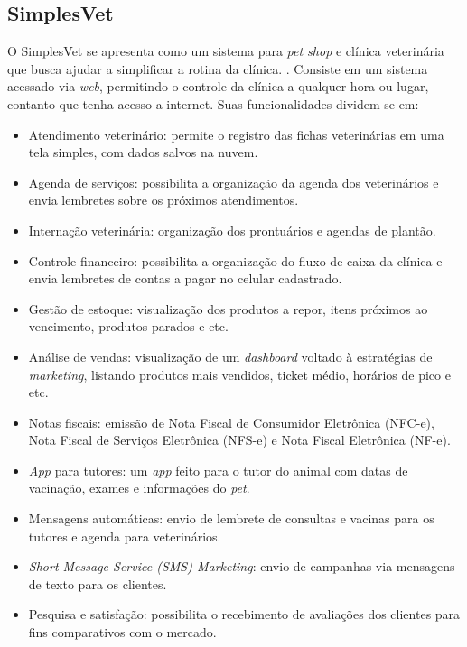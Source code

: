 \documentclass[
    12pt,               %
    openright,          %
    oneside,
    a4paper,            %
    BIBLATEX,           %
    TODO,               %
    english,            %
    brazil              %
    ]{ifsp-spo-inf-ctds}
\begin{document}
    \subsection{SimplesVet}
    O SimplesVet se apresenta como um sistema para \emph{pet shop} e clínica veterinária que busca ajudar a simplificar a rotina da clínica. . Consiste em um sistema acessado via \emph{web}, permitindo o controle da clínica a qualquer hora ou lugar, contanto que tenha acesso a internet. Suas funcionalidades dividem-se em:

\begin{itemize}
    
    \item Atendimento veterinário: permite o registro das fichas veterinárias em uma tela simples, com dados salvos na nuvem.
    \item Agenda de serviços: possibilita a organização da agenda dos veterinários e envia lembretes sobre os próximos atendimentos.
    \item Internação veterinária: organização dos prontuários e agendas de plantão.
    \item Controle financeiro: possibilita a organização do fluxo de caixa da clínica e envia lembretes de contas a pagar no celular cadastrado.
    \item Gestão de estoque: visualização dos produtos a repor, itens próximos ao vencimento, produtos parados e etc.
    \item Análise de vendas: visualização de um \emph{dashboard} voltado à estratégias de \emph{marketing}, listando produtos mais vendidos, ticket médio, horários de pico e etc.
    \item Notas fiscais: emissão de Nota Fiscal de Consumidor Eletrônica (NFC-e), Nota Fiscal de Serviços Eletrônica (NFS-e) e Nota Fiscal Eletrônica (NF-e).
    \item \emph{App} para tutores: um \emph{app} feito para o tutor do animal com datas de vacinação, exames e informações do \emph{pet}.
    \item Mensagens automáticas: envio de lembrete de consultas e vacinas para os tutores e agenda para veterinários.
    \item \emph{Short Message Service (SMS) Marketing}: envio de campanhas via mensagens de texto para os clientes.
    \item Pesquisa e satisfação: possibilita o recebimento de avaliações dos clientes para fins comparativos com o mercado.
\end{itemize}
\end{document}
